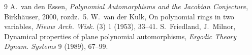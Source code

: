 \begin{thebibliography}{9}
 A.~van den Essen, \emph{Polynomial Automorphisms and the Jacobian
Conjecture}, Birkhäuser, 2000, rozdz.~5.
 W.~van der Kulk, On polynomial rings in two variables,
\emph{Nieuw Arch. Wisk.} (3) 1 (1953), 33--41.
 S.~Friedland, J.~Milnor, Dynamical properties of plane polynomial automorphisms,
\emph{Ergodic Theory Dynam. Systems} 9 (1989), 67--99.
\end{thebibliography}
